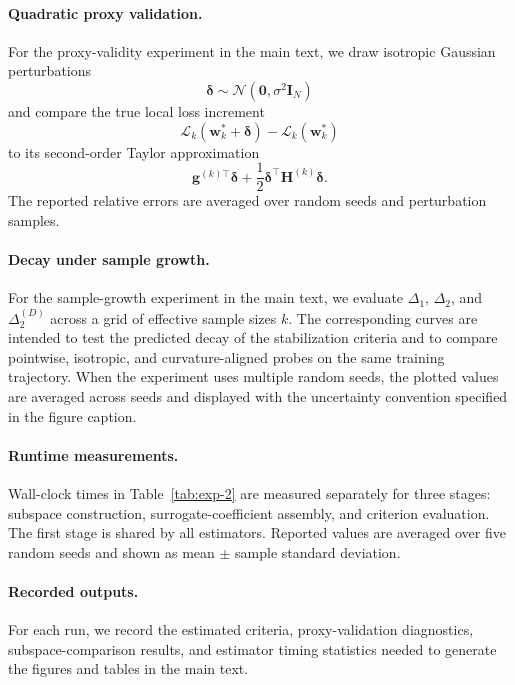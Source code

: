 \documentclass{article}
\begin{document}
\paragraph{Quadratic proxy validation.}
For the proxy-validity experiment in the main text, we draw isotropic Gaussian perturbations
\[
\boldsymbol{\delta}\sim\mathcal N(\mathbf 0,\sigma^2\mathbf I_N)
\]
and compare the true local loss increment
\[
\mathcal L_k(\mathbf w_k^*+\boldsymbol{\delta})-\mathcal L_k(\mathbf w_k^*)
\]
to its second-order Taylor approximation
\[
\mathbf g^{(k)\top}\boldsymbol{\delta}+\frac12\boldsymbol{\delta}^\top \mathbf H^{(k)}\boldsymbol{\delta}.
\]
The reported relative errors are averaged over random seeds and perturbation samples.

\paragraph{Decay under sample growth.}
For the sample-growth experiment in the main text, we evaluate $\Delta_1$, $\Delta_2$, and $\Delta_2^{(D)}$ across a grid of effective sample sizes $k$. The corresponding curves are intended to test the predicted decay of the stabilization criteria and to compare pointwise, isotropic, and curvature-aligned probes on the same training trajectory. When the experiment uses multiple random seeds, the plotted values are averaged across seeds and displayed with the uncertainty convention specified in the figure caption.

\paragraph{Runtime measurements.}
Wall-clock times in Table~\ref{tab:exp-2} are measured separately for three stages: subspace construction, surrogate-coefficient assembly, and criterion evaluation. The first stage is shared by all estimators. Reported values are averaged over five random seeds and shown as mean $\pm$ sample standard deviation.

\paragraph{Recorded outputs.}
For each run, we record the estimated criteria, proxy-validation diagnostics, subspace-comparison results, and estimator timing statistics needed to generate the figures and tables in the main text.
\end{document}
